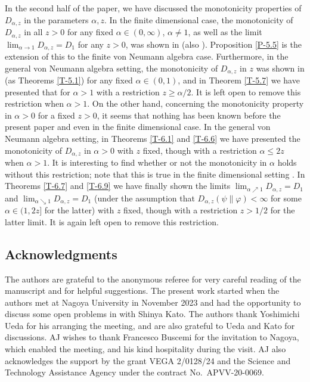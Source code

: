 \documentclass[12pt]{article}
\theoremstyle{definition}
\theoremstyle{remark}
\numberwithin{equation}{section}
\def\ffi{\varphi}
\begin{document}
In the second half of the paper, we have discussed the monotonicity properties of $D_{\alpha,z}$ in the
parameters $\alpha,z$. In the finite dimensional case, the monotonicity of $D_{\alpha,z}$ in all $z>0$ for
any fixed $\alpha\in(0,\infty)$, $\alpha\ne1$, as well as the limit $\lim_{\alpha\to1}D_{\alpha,z}=D_1$ for
any $z>0$, was shown in \cite{lin2015investigating} (also \cite{mosonyi2023somecontinuity}).
Proposition \ref{P-5.5} is the extension of this to the finite von Neumann algebra case. Furthermore,
in the general von Neumann algebra setting, the monotonicity of $D_{\alpha,z}$ in $z$ was shown in
\cite{kato2023onrenyi} (as Theorems \ref{T-5.1}) for any fixed $\alpha\in(0,1)$, and in Theorem \ref{T-5.7}
we have presented that for $\alpha>1$ with a restriction $z\ge\alpha/2$. It is left open to remove this
restriction when $\alpha>1$. On the other hand, concerning the monotonicity property in $\alpha>0$ for
a fixed $z>0$, it seems that nothing has been known before the present paper and
\cite{hiai2024log-majorization} even in the finite dimensional case. In the general von Neumann algebra
setting, in Theorems \ref{T-6.1} and \ref{T-6.6} we have presented the monotonicity of $D_{\alpha,z}$ in
$\alpha>0$ with $z$ fixed, though with a restriction $\alpha\le2z$ when $\alpha>1$. 
It is interesting to find whether or not the monotonicity in $\alpha$ holds without this restriction;
note that this is true in the finite dimensional setting \cite[Theorem
3.1(ii)]{hiai2024log-majorization}. In Theorems \ref{T-6.7} and
\ref{T-6.9} we have finally shown the limits $\lim_{\alpha\nearrow1}D_{\alpha,z}=D_1$ and
$\lim_{\alpha\searrow1}D_{\alpha,z}=D_1$ (under the assumption that $D_{\alpha,z}(\psi\|\ffi)<\infty$ for
some $\alpha\in(1,2z]$ for the latter) with $z$ fixed, though with a restriction $z>1/2$ for the latter limit.
It is again left open to remove this restriction.


\subsection*{Acknowledgments}

The authors are grateful to the anonymous referee for very careful reading of the manuscript and
for helpful suggestions. The present work started when the authors met at Nagoya University in
November 2023 and had the opportunity to discuss some open problems in \cite{kato2023onrenyi} with
Shinya Kato. The authors thank Yoshimichi Ueda for his arranging the meeting, and are also grateful to
Ueda and Kato for discussions. AJ wishes to thank Francesco Buscemi for the invitation to Nagoya,
which enabled the meeting, and his kind hospitality during the visit. AJ also acknowledges the support by
the grant VEGA 2/0128/24 and the  Science and Technology Assistance Agency under the
contract No.\ APVV-20-0069.
\end{document}
